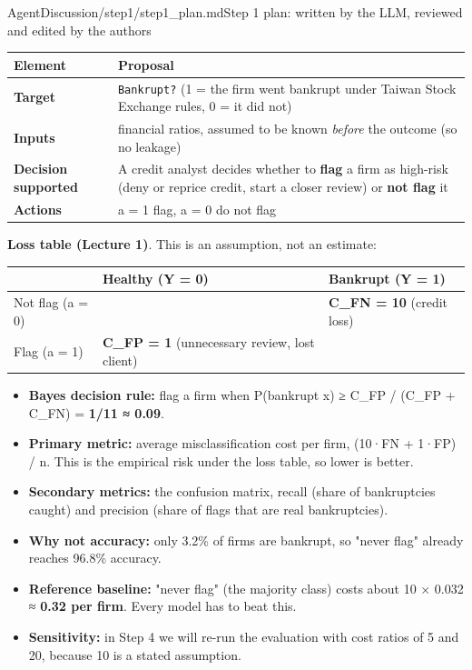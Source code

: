 \begin{mdfile}{AgentDiscussion/\allowbreak{}step1/\allowbreak{}step1\_plan.md}{Step 1 plan: written by the LLM, reviewed and edited by the authors}


{\def\LTcaptype{none} %
\begin{tabularx}{\linewidth}{@{}l>{\raggedright\arraybackslash}X@{}}
\toprule\noalign{}
Element & Proposal \\
\midrule\noalign{}
\textbf{Target} & \texttt{Bankrupt?} (1 = the firm went bankrupt under Taiwan Stock Exchange rules, 0 = it did not) \\
\textbf{Inputs} & 95 financial ratios, assumed to be known \emph{before} the outcome (so no leakage) \\
\textbf{Decision supported} & A credit analyst decides whether to \textbf{flag} a firm as high-risk (deny or reprice credit, start a closer review) or \textbf{not flag} it \\
\textbf{Actions} & a = 1 flag, a = 0 do not flag \\
\bottomrule
\end{tabularx}
}

\textbf{Loss table (Lecture 1)}. This is an assumption, not an estimate:

{\def\LTcaptype{none} %
\begin{tabularx}{\linewidth}{@{}l>{\raggedright\arraybackslash}X>{\raggedright\arraybackslash}X@{}}
\toprule\noalign{}
& Healthy (Y = 0) & Bankrupt (Y = 1) \\
\midrule\noalign{}
Not flag (a = 0) & 0 & \textbf{C\_FN = 10} (credit loss) \\
Flag (a = 1) & \textbf{C\_FP = 1} (unnecessary review, lost client) & 0 \\
\bottomrule
\end{tabularx}
}

\begin{itemize}
\tightlist
\item
  \textbf{Bayes decision rule:} flag a firm when P(bankrupt \textbar{} x) ≥ C\_FP / (C\_FP + C\_FN) = \textbf{1/11 ≈ 0.09}.
\item
  \textbf{Primary metric:} average misclassification cost per firm, (10·FN + 1·FP) / n. This is the empirical risk under the loss table, so lower is better.
\item
  \textbf{Secondary metrics:} the confusion matrix, recall (share of bankruptcies caught) and precision (share of flags that are real bankruptcies).
\item
  \textbf{Why not accuracy:} only 3.2\% of firms are bankrupt, so "never flag" already reaches 96.8\% accuracy.
\item
  \textbf{Reference baseline:} "never flag" (the majority class) costs about 10 × 0.032 ≈ \textbf{0.32 per firm}. Every model has to beat this.
\item
  \textbf{Sensitivity:} in Step 4 we will re-run the evaluation with cost ratios of 5 and 20, because 10 is a stated assumption.
\end{itemize}


\end{mdfile}

